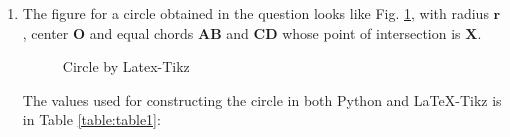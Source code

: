 \renewcommand{\vec}[1]{\mathbf{#1}}
\begin{enumerate}
\item
The figure for a circle obtained in the question looks like Fig. \ref{fig:stepthree}, with radius $\vec{r}$, center $\vec{O}$ and equal chords $\vec{AB}$ and $\vec{CD}$ whose point of intersection is $\vec{X}$.  
\begin{figure}[!ht]
\centering
\resizebox{\columnwidth}{!}{}
\caption{Circle by Latex-Tikz}
\label{fig:stepthree}	
\end{figure}

The values used for constructing the circle in both Python and \LaTeX{}-Tikz is in Table \ref{table:table1}:\\
\begin{table}[ht]
    \begin{center}
  \caption{To construct $\circle O$}
   \label{table:table1}
   \end{center}	
\end{table}


\end{enumerate}

